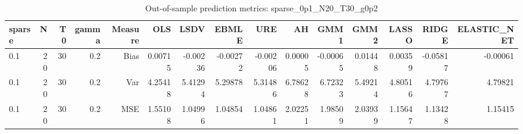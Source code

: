 \begin{table}[!htbp]\centering
\caption{Out-of-sample prediction metrics: sparse_0p1_N20_T30_g0p2}
\label{tab:table3_sparse_0p1_N20_T30_g0p2}
\begin{tabular}{lrrrrrrrrrrrrrr}
\hline
sparse & N & T0 & gamma & Measure & OLS & LSDV & EBMLE & URE & AH & GMM1 & GMM2 & LASSO & RIDGE & ELASTIC_NET \\
\hline
0.1 & 20 & 30 & 0.2 & Bias & 0.00715 & -0.00236 & -0.00272 & -0.00206 & 0.00005 & -0.00065 & 0.01448 & 0.00359 & -0.05817 & -0.00061 \\
0.1 & 20 & 30 & 0.2 & Var & 4.25418 & 5.41294 & 5.29878 & 5.31486 & 6.78628 & 6.72323 & 5.49214 & 4.80516 & 4.79767 & 4.79821 \\
0.1 & 20 & 30 & 0.2 & MSE & 1.55108 & 1.04996 & 1.04854 & 1.04861 & 2.02251 & 1.98509 & 2.03939 & 1.15647 & 1.13428 & 1.15415 \\
\hline
\end{tabular}
\end{table}


